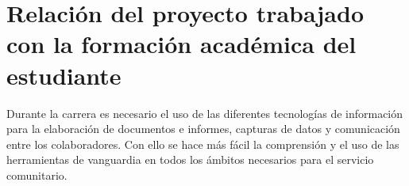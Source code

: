 \chapter{Relación del proyecto trabajado con la formación académica del estudiante}

    Durante la carrera es necesario el uso de las diferentes tecnologías de información para la elaboración de documentos e informes, capturas de datos y comunicación entre los colaboradores. Con ello se hace más fácil la comprensión y el uso de las herramientas de vanguardia en todos los ámbitos necesarios para el servicio comunitario.
    

        
        
        
        
        
    
    
 
\pagebreak